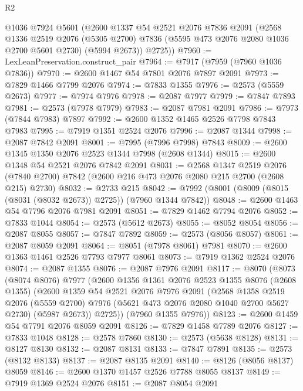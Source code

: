 \begin{lexlean}{R2}
\begin{coremodule}
      @1036
      @7924
      @5601
      (@2600
        @1337
        @54
        @2521
        @2076
        @7836
        @2091
        (@2568
          @1336
          @2519
          @2076
          (@5305 @2700)
          @7836
          (@5595 @473 @2076 @2080 @1036 @2700 @5601 @2730)
          (@5994 @2673))
        @2725))
@7960 := LexLeanPreservation.construct_pair
@7964 := @7917 (@7959 (@7960 @1036 @7836))
@7970 := @2600 @1467 @54 @7801 @2076 @7897 @2091
@7973 := @7829 @1466 @7799 @2076
@7974 := @7833 @1355
@7976 := @2573 (@5559 @2673)
@7977 := @7974 @7976
@7978 := @2087 @7977
@7979 := @7847 @7893
@7981 := @2573 (@7978 @7979)
@7983 := @2087 @7981 @2091
@7986 := @7973 (@7844 @7983) @7897
@7992 := @2600 @1352 @1465 @2526 @7798 @7843 @7983
@7995 := @7919 @1351 @2524 @2076
@7996 := @2087 @1344
@7998 := @2087 @7842 @2091
@8001 := @7995 (@7996 @7998) @7843
@8009 := @2600 @1345 @1350 @2076 @2523 @1344 @7998 (@2608 @1344)
@8015 := @2600 @1348 @54 @2521 @2076 @7842 @2091
@8031 := @2568
    @1347
    @2519
    @2076
    (@7840 @2700)
    @7842
    (@2600 @216 @473 @2076 @2080 @215 @2700 (@2608 @215) @2730)
@8032 := @2733 @215
@8042 := @7992 (@8001 (@8009 (@8015 (@8031 (@8032 @2673)) @2725)) (@7960 @1344 @7842))
@8048 := @2600 @1463 @54 @7796 @2076 @7981 @2091
@8051 := @7829 @1462 @7794 @2076
@8052 := @7833 @1044
@8054 := @2573 (@5612 @2673)
@8055 := @8052 @8054
@8056 := @2087 @8055
@8057 := @7847 @7892
@8059 := @2573 (@8056 @8057)
@8061 := @2087 @8059 @2091
@8064 := @8051 (@7978 @8061) @7981
@8070 := @2600 @1363 @1461 @2526 @7793 @7977 @8061
@8073 := @7919 @1362 @2524 @2076
@8074 := @2087 @1355
@8076 := @2087 @7976 @2091
@8117 := @8070
    (@8073
      (@8074 @8076)
      @7977
      (@2600
        @1356
        @1361
        @2076
        @2523
        @1355
        @8076
        (@2608 @1355)
        (@2600
          @1359
          @54
          @2521
          @2076
          @7976
          @2091
          (@2568
            @1358
            @2519
            @2076
            (@5559 @2700)
            @7976
            (@5621 @473 @2076 @2080 @1040 @2700 @5627 @2730)
            (@5987 @2673))
          @2725))
      (@7960 @1355 @7976))
@8123 := @2600 @1459 @54 @7791 @2076 @8059 @2091
@8126 := @7829 @1458 @7789 @2076
@8127 := @7833 @1048
@8128 := @2578 @7860
@8130 := @2573 (@5638 @8128)
@8131 := @8127 @8130
@8132 := @2087 @8131
@8133 := @7847 @7891
@8135 := @2573 (@8132 @8133)
@8137 := @2087 @8135 @2091
@8140 := @8126 (@8056 @8137) @8059
@8146 := @2600 @1370 @1457 @2526 @7788 @8055 @8137
@8149 := @7919 @1369 @2524 @2076
@8151 := @2087 @8054 @2091

\end{coremodule}
\end{lexlean}
